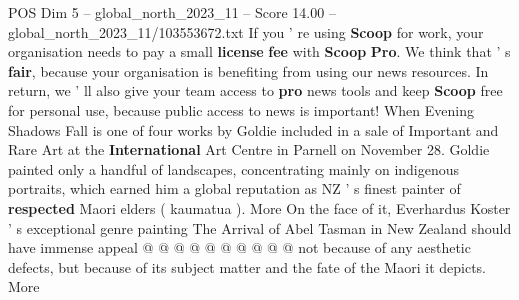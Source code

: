 \begin{textsample}{POS Dim 5 – global\_north\_2023\_11 – Score 14.00 – global\_north\_2023\_11/103553672.txt}
If you ' re using \textbf{Scoop} for work, your organisation needs to pay a small \textbf{license} \textbf{fee} with \textbf{Scoop} \textbf{Pro}.
We think that ' s \textbf{fair}, because your organisation is benefiting from using our news resources.
In return, we ' ll also give your team access to \textbf{pro} news tools and keep \textbf{Scoop} free for personal use, because public access to news is important!
When Evening Shadows Fall is one of four works by Goldie included in a sale of Important and Rare Art at the \textbf{International} Art Centre in Parnell on November 28.
Goldie painted only a handful of landscapes, concentrating mainly on indigenous portraits, which earned him a global reputation as NZ ' s finest painter of \textbf{respected} Maori elders ( kaumatua ).
More On the face of it, Everhardus Koster ' s exceptional genre painting The Arrival of Abel Tasman in New Zealand should have immense appeal @ @ @ @ @ @ @ @ @ @ not because of any aesthetic defects, but because of its subject matter and the fate of the Maori it depicts.
More

\end{textsample}

